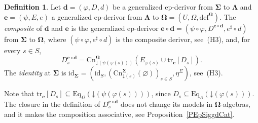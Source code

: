 \documentclass{amsart}
\newcommand{\vs}[1]{\mathbin{\downarrow}#1}
\theoremstyle{plain}
\theoremstyle{definition}
\newtheorem{definition}[theorem]{Definition}
\begin{document}
\begin{definition}\label{DGenEpComp}
Let $\mathbf{d}=(\varphi,D,d)$ be a generalized ep-derivor from $\mathbf{\Sigma}$ to $\mathbf{\Lambda}$ and $\mathbf{e}=(\psi,E,e)$ a generalized ep-derivor from $\mathbf{\Lambda}$ to $\mathbf{\Omega}=(U,\Omega,\mathrm{def}^{\mathbf{\Omega}})$. The \emph{composite} of $\mathbf{d}$ and $\mathbf{e}$ is the generalized ep-derivor $\mathbf{e}\circ\mathbf{d}=(\psi\circ\varphi,D^{\mathbf{e}\circ\mathbf{d}},e^{\sharp}\circ d)$ from $\mathbf{\Sigma}$ to $\mathbf{\Omega}$, where $(\psi\circ\varphi,e^{\sharp}\circ d)$ is the composite derivor, see~(H3), and, for every $s\in S$,
$$
D^{\mathbf{e}\circ\mathbf{d}}_{s}=\mathrm{Cn}^{\mathbf{\Omega}}_{\vs{(\psi(\varphi(s)))}}\left(E_{\varphi(s)}\cup\mathrm{tr}_{\mathbf{e}}[D_{s}]\right).
$$
The \emph{identity} at $\mathbf{\Sigma}$ is $\mathrm{id}_{\mathbf{\Sigma}}=(\mathrm{id}_{S},(\mathrm{Cn}^{\mathbf{\Sigma}}_{\vs{(s)}}(\varnothing))_{s\in S},\eta^{\Sigma})$, see~(H3).
\end{definition}

Note that $\mathrm{tr}_{\mathbf{e}}[D_{s}]\subseteq\mathrm{Eq}_{\Omega}(\vs{(\psi(\varphi(s)))})$, since $D_{s}\subseteq\mathrm{Eq}_{\Lambda}(\vs{(\varphi(s))})$. The closure in the definition of $D^{\mathbf{e}\circ\mathbf{d}}_{s}$ does not change its models in $\mathbf{\Omega}$-algebras, and it makes the composition associative, see Proposition~\ref{PEpSiggdCat}.
\end{document}

